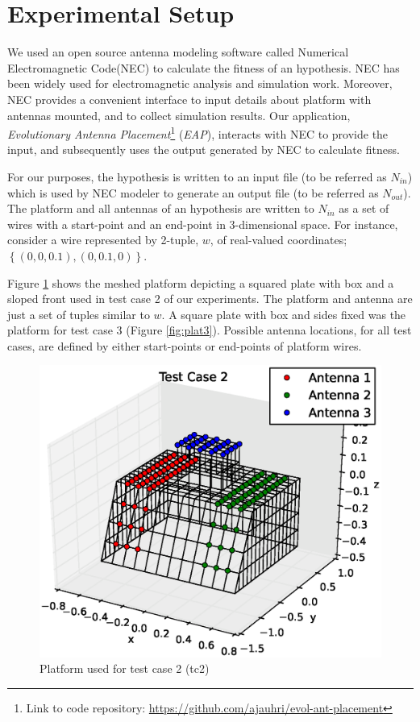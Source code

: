 \documentclass{sig-alternate}
\begin{document}
\section{Experimental Setup}
\label{sec:setup}
We used an open source antenna modeling software called Numerical Electromagnetic Code(NEC) to calculate the fitness of an hypothesis. NEC has been widely used for electromagnetic analysis and simulation work. Moreover, NEC provides a convenient interface to input details about platform with antennas mounted, and to collect simulation results. Our application, \textit{Evolutionary Antenna Placement}\footnote{Link to code repository: \url{https://github.com/ajauhri/evol-ant-placement}} (\textit{EAP}), interacts with NEC to provide the input, and subsequently uses the output generated by NEC to calculate fitness. 

For our purposes, the hypothesis is written to an input file (to be referred as $N_{in}$) which is used by NEC modeler to generate an output file (to be referred as $N_{out}$). The platform and all antennas of an hypothesis are written to $N_{in}$ as a set of wires with a start-point and an end-point in 3-dimensional space. For instance, consider a wire represented by 2-tuple, $w$, of real-valued coordinates; $\left\{(0,0,0.1), (0,0.1,0)\right\}$. 

Figure \ref{fig:plat2} shows the meshed platform depicting a squared plate with box and a sloped front used in test case 2 of our experiments. The platform and antenna are just a set of tuples similar to $w$. A square plate with box and sides fixed was the platform for test case 3 (Figure \ref{fig:plat3}). Possible antenna locations, for all test cases, are defined by either start-points or end-points of platform wires.  
\begin{figure}
    \begin{center}
        \includegraphics[width=.41\textwidth]{FIG/tc_2_figure}
\end{center}
\caption{Platform used for test case 2 (tc2)}
\label{fig:plat2}
\end{figure}
\end{document}
